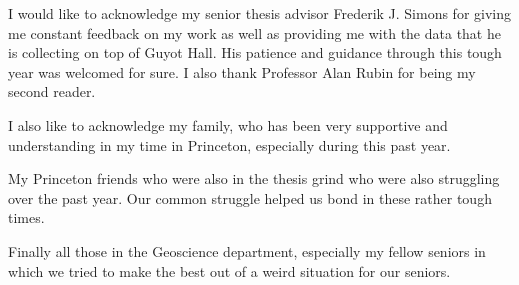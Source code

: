 

I would like to acknowledge my senior thesis advisor Frederik J. Simons for giving me constant feedback on my work as well as providing me with the data that he is collecting on top of Guyot Hall. His patience and guidance through this tough year was welcomed for sure. I also thank Professor Alan Rubin for being my second reader. 

I also like to acknowledge my family, who has been very supportive and understanding in my time in Princeton, especially during this past year. 

My Princeton friends who were also in the thesis grind who were also struggling over the past year. Our common struggle helped us bond in these rather tough times. 

Finally all those in the Geoscience department, especially my fellow seniors in which we tried to make the best out of a weird situation for our seniors. 